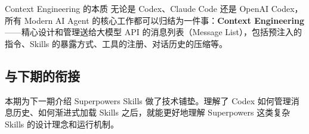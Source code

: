 \documentclass[a4paper]{article}
\begin{document}
\begin{importantbox}{Context Engineering 的本质}
无论是 Codex、Claude Code 还是 OpenAI Codex，所有 Modern AI Agent 的核心工作都可以归结为一件事：\textbf{Context Engineering}——精心设计和管理送给大模型 API 的消息列表（Message List），包括预注入的指令、Skills 的暴露方式、工具的注册、对话历史的压缩等。
\end{importantbox}

\subsection{与下期的衔接}

本期为下一期介绍 Superpowers Skills 做了技术铺垫。理解了 Codex 如何管理消息历史、如何渐进式加载 Skills 之后，就能更好地理解 Superpowers 这类复杂 Skills 的设计理念和运行机制。

\end{document}
